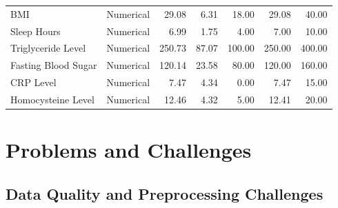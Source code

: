\documentclass[11pt,a4paper]{article}
\begin{document}
\begin{table}[H]
\begin{tabular}{|l|l|r|r|r|r|r|}
        BMI                  & Numerical     & 29.08         & 6.31             & 18.00        & 29.08           & 40.00        \\
        Sleep Hours          & Numerical     & 6.99          & 1.75             & 4.00         & 7.00            & 10.00        \\
        Triglyceride Level   & Numerical     & 250.73        & 87.07            & 100.00       & 250.00          & 400.00       \\
        Fasting Blood Sugar  & Numerical     & 120.14        & 23.58            & 80.00        & 120.00          & 160.00       \\
        CRP Level            & Numerical     & 7.47          & 4.34             & 0.00         & 7.47            & 15.00        \\
        Homocysteine Level   & Numerical     & 12.46         & 4.32             & 5.00         & 12.41           & 20.00        \\
        \hline
    \end{tabular}
\end{table}


\section{Problems and Challenges}


\subsection{Data Quality and Preprocessing Challenges}
\end{document}
